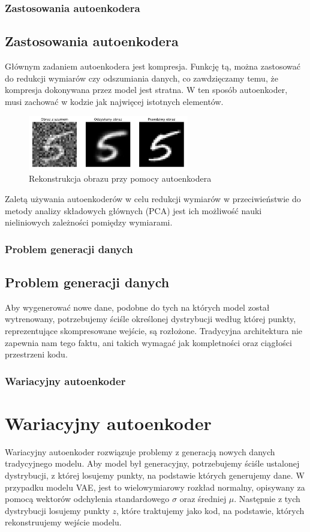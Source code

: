 \documentclass{beamer}
\begin{document}
	\begin{frame}
		\frametitle{Zastosowania autoenkodera}
		\subsection{Zastosowania autoenkodera}
		Głównym zadaniem autoenkodera jest kompresja. Funkcję tą, można zastosować do redukcji wymiarów czy odszumiania danych, co zawdzięczamy temu, że kompresja dokonywana przez model jest stratna. W ten sposób autoenkoder, musi zachować w kodzie jak najwięcej istotnych elementów. 
		\vspace{-0.3cm}
		\begin{figure}
			\centering\includegraphics[width=7cm]{denoisingae.pdf}
			\caption{Rekonstrukcja obrazu przy pomocy autoenkodera}
		\end{figure}
		\vspace{-0.5cm}
		Zaletą używania autoenkoderów w celu redukcji wymiarów w przeciwieństwie do metody analizy składowych głównych (PCA) jest ich możliwość nauki nieliniowych zależności pomiędzy wymiarami.
	\end{frame}

	\begin{frame}
		\frametitle{Problem generacji danych}
		\subsection{Problem generacji danych}
		Aby wygenerować nowe dane, podobne do tych na których model został wytrenowany, potrzebujemy ściśle określonej dystrybucji według której punkty, reprezentujące skompresowane wejście, są rozłożone. Tradycyjna architektura nie zapewnia nam tego faktu, ani takich wymagać jak kompletności oraz ciągłości przestrzeni kodu. 
	\end{frame}
		
	\begin{frame}
		\frametitle{Wariacyjny autoenkoder}
		\section{Wariacyjny autoenkoder}
		Wariacyjny autoenkoder rozwiązuje problemy z generacją nowych danych tradycyjnego modelu. Aby model był generacyjny, potrzebujemy ściśle ustalonej dystrybucji, z której losujemy punkty, na podstawie których generujemy dane. W przypadku modelu VAE, jest to wielowymiarowy rozkład normalny, opisywany za pomocą wektorów odchylenia standardowego $\sigma$ oraz średniej $\mu$. Następnie z tych dystrybucji losujemy punkty $z$, które traktujemy jako kod, na podstawie, których rekonstruujemy wejście modelu.
	\end{frame}
\end{document}
